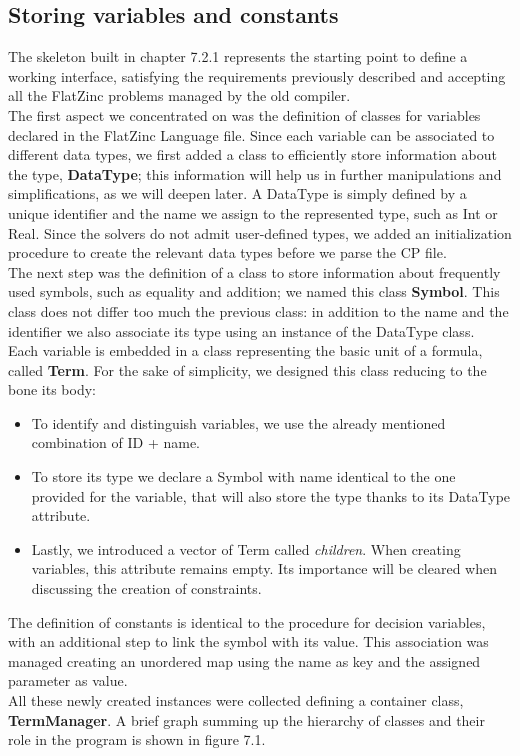 \subsection{Storing variables and constants}

The skeleton built in chapter 7.2.1 represents the starting point to define a working interface, satisfying the requirements previously described and accepting all the FlatZinc problems managed by the old compiler. \\
The first aspect we concentrated on was the definition of classes for variables declared in the FlatZinc Language file. Since each variable can be associated to different data types, we first added a class to efficiently store information about the type, \textbf{DataType}; this information will help us in further manipulations and simplifications, as we will deepen later. A DataType is simply defined by a unique identifier and the name we assign to the represented type, such as Int or Real. Since the solvers do not admit user-defined types, we added an initialization procedure to create the relevant data types before we parse the CP file. \\
The next step was the definition of a class to store information about frequently used symbols, such as equality and addition; we named this class \textbf{Symbol}. This class does not differ too much the previous class: in addition to the name and the identifier we also associate its type using an instance of the DataType class.\\
Each variable is embedded in a class representing the basic unit of a formula, called \textbf{Term}. For the sake of simplicity, we designed this class reducing to the bone its body:

\begin{itemize}
    \item To identify and distinguish variables, we use the already mentioned combination of ID + name.
    \item To store its type we declare a Symbol with name identical to the one provided for the variable, that will also store the type thanks to its DataType attribute.
    \item Lastly, we introduced a vector of Term called \textit{children}. When creating variables, this attribute remains empty. Its importance will be cleared when discussing the creation of constraints.
\end{itemize}

The definition of constants is identical to the procedure for decision variables, with an additional step to link the symbol with its value. This association was managed creating an unordered map using the name as key and the assigned parameter as value. \\
All these newly created instances were collected defining a container class, \textbf{TermManager}.
A brief graph summing up the hierarchy of classes and their role in the program is shown in figure 7.1. 

